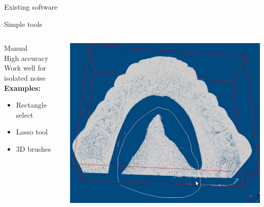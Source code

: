 \documentclass{beamer}
\begin{document}
\begin{frame}{Existing software}

\end{frame}

\begin{frame}{Simple tools}

\begin{columns}[T]
\begin{column}{0.5\textwidth}
Manual\\
High accuracy\\
Work well for isolated noise\\
\textbf{Examples:}
\begin{itemize}
\item Rectangle select
\item Lasso tool
\item 3D brushes
\end{itemize}

\end{column}
\begin{column}{0.5\textwidth}
\includegraphics[width=1\textwidth]{pics/lasso.png}
\end{column}

\end{columns}

\end{frame}
\end{document}
